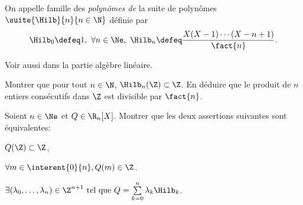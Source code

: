 \begin{defi}
    On appelle famille des \emph{polynômes de } la suite de polynômes $\suite{\Hilb}{n}{n \in \N}$ définie par
    $$\Hilb_0 \defeq 1,\ \forall n \in \Ne,\ \Hilb_n \defeq \frac{X(X-1)\cdots(X-n+1)}{\fact{n}}.$$
\end{defi}

Voir aussi  dans la partie algèbre linéaire. 

\begin{exercice}
    \begin{questions}
        \item Montrer que pour tout $n \in \N$, $\Hilb_n(\Z) \subset \Z$. En déduire que le produit de $n$ entiers consécutifs dans $\Z$ est divisible par $\fact{n}$.
        \item Soient $n \in \Ne$ et $Q \in \R_n[X]$. Montrer que les deux assertions suivantes sont équivalentes:
        \begin{questions}
            \item $Q(\Z) \subset \Z$,
            \item $\forall m \in \interent{0}{n}, Q(m) \in \Z$.
            \item $\exists (\lambda_0, \dots, \lambda_n) \in \Z^{n+1} \text{ tel que } Q = \sum\limits_{k=0}^n \lambda_k \Hilb_k$.
        \end{questions}
    \end{questions}
\end{exercice}

\begin{solution}
\end{solution}